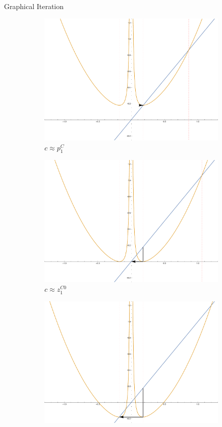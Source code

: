 \documentclass{beamer}
\newcommand{\<}{\left\langle}
\renewcommand{\>}{\right\rangle} %
\renewcommand{\*}{\cdot} %
\begin{document}
\begin{frame}{Graphical Iteration}
	\begin{figure}[h]
		\centering
		\begin{subfigure}[b]{0.4\textwidth}
				\includegraphics[width=\textwidth]{./img/it1-1}
				\caption{$c \approx p_1^{C}$}
		\end{subfigure}%
		\begin{subfigure}[b]{0.4\textwidth}
				\includegraphics[width=\textwidth]{./img/it1-2}
				\caption{$c \approx z_1^{C0}$}
		\end{subfigure}
		\begin{subfigure}[b]{0.4\textwidth}
				\includegraphics[width=\textwidth]{./img/it1-3}

\end{subfigure}
\end{figure}
\end{frame}
\end{document}
